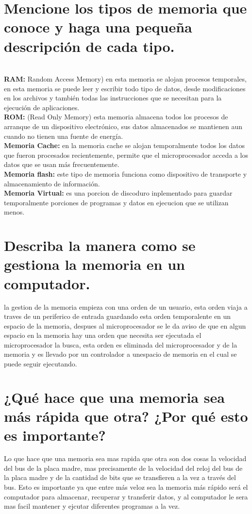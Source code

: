\documentclass{article}
\begin{document}
\section{Mencione los tipos de memoria que conoce y haga una pequeña descripción de cada tipo.}\\
\textbf{RAM:} Random Access Memory) en esta memoria se alojan procesos temporales, en esta memoria se puede leer y escribir todo tipo de datos, desde modificaciones en los archivos y también todas las instrucciones que se necesitan para la ejecución de aplicaciones.\\
\textbf{ROM:} (Read Only Memory) esta memoria almacena todos los procesos de arranque de un dispositivo electrónico, sus datos almacenados se mantienen aun cuando no tienen una fuente de energía.\\
\textbf{Memoria Cache:} en la memoria cache se alojan temporalmente todos los datos que fueron procesados recientemente, permite que el microprocesador acceda a los datos que se usan más frecuentemente.\\
\textbf{Memoria flash:} este tipo de memoria funciona como dispositivo de transporte y almacenamiento de información.\\
\textbf{Memoria Virtual:} es una porcion de discoduro inplementado para guardar temporalmente porciones de programas y datos en ejecucion que se utilizan menos.


\section{Describa la manera como se gestiona la memoria en un computador.}
la gestion de la memoria empieza con una orden de un usuario, esta orden viaja a traves de un periferico de entrada guardando esta orden temporalente en un espacio de la memoria, despues al microprocesador se le da aviso de que en algun espacio en la memoria hay una orden que necesita ser ejecutada el microprocesador la busca, esta orden es eliminada del microprocesador y de la memoria y es llevado por un controlador a unespacio de memoria en el cual se puede seguir ejecutando.
\section{¿Qué hace que una memoria sea más rápida que otra? ¿Por qué esto es importante?}
Lo que hace que una memoria sea mas rapida que otra son dos cosas la velocidad del bus de la placa madre, mas precisamente de la velocidad del reloj del bus de la placa madre y de la cantidad de bits que se transfieren a la vez a través del bus.
Esto es importante ya que entre más veloz sea la memoria más rápido será el computador para almacenar, recuperar y transferir datos, y al computador le sera mas facil mantener y ejcutar diferentes programas a la vez.\\
\\
\\
\end{document}
